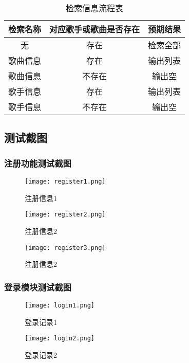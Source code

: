 \documentclass[UTF8,14pt]{article}
\numberwithin{figure}{subsubsection}
\numberwithin{table}{subsubsection}
\begin{document}
\begin{table}[H]
	\centering
	\begin{tabular}{ccc}
		\hline
		\multicolumn{1}{c}{检索名称} & \multicolumn{1}{c}{对应歌手或歌曲是否存在} & \multicolumn{1}{c}{预期结果} \\ \hline
		无                           & 存在                                       & 检索全部                     \\
		歌曲信息                     & 存在                                       & 输出列表                     \\
		歌曲信息                     & 不存在                                     & 输出空                       \\
		歌手信息                     & 存在                                       & 输出列表                     \\
		歌手信息                     & 不存在                                     & 输出空                       \\\hline
	\end{tabular}
	\caption{检索信息流程表}
\end{table}
\subsection{测试截图}
\subsubsection{注册功能测试截图}
\begin{minipage}[t]{0.5\linewidth}
	\begin{figure}[H]
		\texttt{[image: register1.png]}
		\caption{注册信息1}
	\end{figure}
\end{minipage}
\hfill
\begin{minipage}[t]{0.5\linewidth}
	\begin{figure}[H]
		\centering
		\texttt{[image: register2.png]}
		\caption{注册信息2}
	\end{figure}
\end{minipage}
\begin{figure}[H]
	\centering
	\texttt{[image: register3.png]}
	\caption{注册信息2}
\end{figure}
\subsubsection{登录模块测试截图}
\begin{minipage}[t]{0.3\linewidth}
	\begin{figure}[H]
		\texttt{[image: login1.png]}
		\caption{登录记录1}
	\end{figure}
\end{minipage}
\hfill
\begin{minipage}[t]{0.7\linewidth}
	\begin{figure}[H]
		\centering
		\texttt{[image: login2.png]}
		\caption{登录记录2}
	\end{figure}
\end{minipage}
\end{document}
